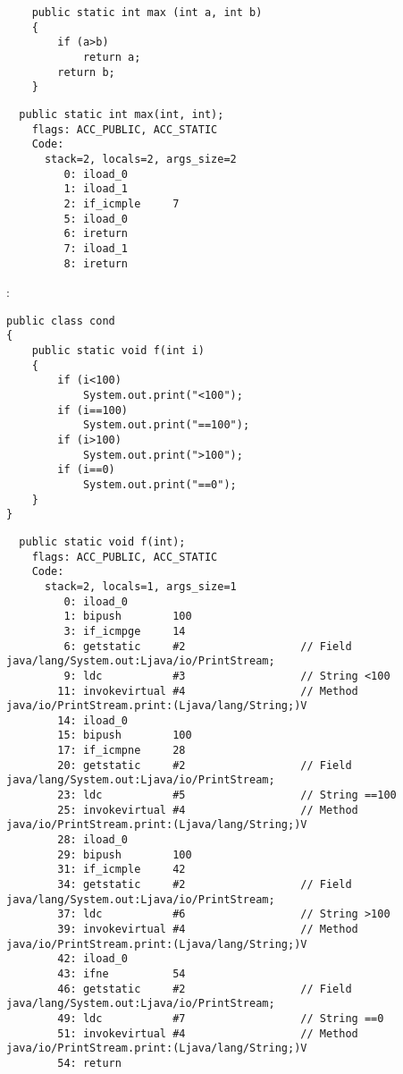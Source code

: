 
\begin{lstlisting}
	public static int max (int a, int b)
	{
		if (a>b)
			return a;
		return b;
	}
\end{lstlisting}


\begin{lstlisting}
  public static int max(int, int);
    flags: ACC_PUBLIC, ACC_STATIC
    Code:
      stack=2, locals=2, args_size=2
         0: iload_0       
         1: iload_1       
         2: if_icmple     7
         5: iload_0       
         6: ireturn       
         7: iload_1       
         8: ireturn       
\end{lstlisting}

:

\begin{lstlisting}
public class cond
{
	public static void f(int i)
	{
		if (i<100)
			System.out.print("<100");
		if (i==100)
			System.out.print("==100");
		if (i>100)
			System.out.print(">100");
		if (i==0)
			System.out.print("==0");
	}
}
\end{lstlisting}

\begin{lstlisting}
  public static void f(int);
    flags: ACC_PUBLIC, ACC_STATIC
    Code:
      stack=2, locals=1, args_size=1
         0: iload_0       
         1: bipush        100
         3: if_icmpge     14
         6: getstatic     #2                  // Field java/lang/System.out:Ljava/io/PrintStream;
         9: ldc           #3                  // String <100
        11: invokevirtual #4                  // Method java/io/PrintStream.print:(Ljava/lang/String;)V
        14: iload_0       
        15: bipush        100
        17: if_icmpne     28
        20: getstatic     #2                  // Field java/lang/System.out:Ljava/io/PrintStream;
        23: ldc           #5                  // String ==100
        25: invokevirtual #4                  // Method java/io/PrintStream.print:(Ljava/lang/String;)V
        28: iload_0       
        29: bipush        100
        31: if_icmple     42
        34: getstatic     #2                  // Field java/lang/System.out:Ljava/io/PrintStream;
        37: ldc           #6                  // String >100
        39: invokevirtual #4                  // Method java/io/PrintStream.print:(Ljava/lang/String;)V
        42: iload_0       
        43: ifne          54
        46: getstatic     #2                  // Field java/lang/System.out:Ljava/io/PrintStream;
        49: ldc           #7                  // String ==0
        51: invokevirtual #4                  // Method java/io/PrintStream.print:(Ljava/lang/String;)V
        54: return        
\end{lstlisting}

